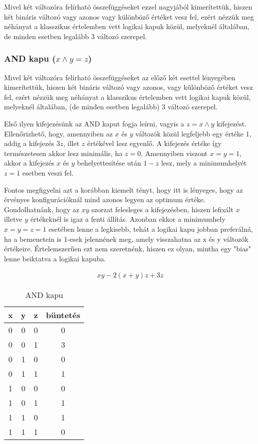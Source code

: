 Mivel két változóra felírható összefüggéseket ezzel nagyjából kimerítettük, hiszen két bináris változó vagy azonos vagy különböző értéket vesz fel, ezért nézzük meg néhányat a klasszikus értelemben vett logikai kapuk közül, melyeknél általában, de minden esetben legalább 3 változó szerepel.

\subsubsection{AND kapu ($x \wedge y = z$)}

Mivel két változóra felírható összefüggéseket az előző két esettel lényegében kimerítettük, hiszen két bináris változó vagy azonos, vagy különböző értéket vesz fel, ezért nézzük meg néhányat a klasszikus értelemben vett logikai kapuk közül, melyeknél általában, (de minden esetben legalább) 3 változó szerepel.


Első ilyen kifejezésünk az AND kaput fogja leírni, vagyis a $z=x \wedge y$ kifejezést. Ellenőrizhető, hogy, amennyiben az $x$ és $y$ változók közül legfeljebb egy értéke $1$, addig a kifejezés $3z$, illet $z$ értékével lesz egyenlő. A kifejezés értéke így természetesen akkor lesz minimális, ha $z=0$. Amennyiben viszont $x=y=1$, akkor a kifejezés $x$ és $y$ behelyettesítése után $1-z$ lesz, mely a minimumhelyét $z=1$ esetben veszi fel.

Fontos megfigyelni azt a korábban kiemelt tényt, hogy itt is lényeges, hogy az érvényes konfigurációknál mind azonos legyen az optimum értéke. Gondolhatnánk, hogy az $xy$ szorzat felesleges a kifejezésben, hiszen lefixált $x$ illetve $y$ értékeknél is igaz a fenti állítás. Azonban ekkor a minimumhely $x=y=z=1$ esetében lenne a legkisebb, tehát a logikai kapu jobban preferálná, ha a bemenetein is 1-esek jelennének meg, amely visszahatna az x és y változók értékeire. Értelemszerűen ezt nem szeretnénk, hiszen ez olyan, mintha egy "bias" lenne beiktatva a logikai kapuba.



\begin{align}
	xy-2(x+y)z+3z
\end{align}

\begin{table}[ht]
	\footnotesize
	\centering
	\begin{tabular}{ c c c c }
		\toprule
		x & y & z & büntetés \\
		\midrule
		0 & 0 & 0 & 0 \\
		0 & 0 & 1 & 3 \\
		0 & 1 & 0 & 0 \\
		0 & 1 & 1 & 1 \\
		1 & 0 & 0 & 0 \\
		1 & 0 & 1 & 1 \\
		1 & 1 & 0 & 1 \\
		1 & 1 & 1 & 0 \\		
		\bottomrule
	\end{tabular}
	\caption{AND kapu}
	\label{tab:ANDgate}
\end{table}

